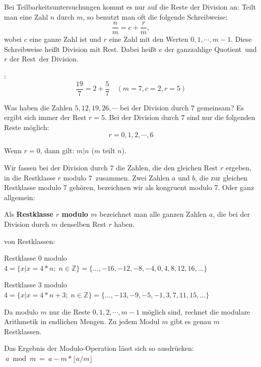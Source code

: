 \begin{refsegment}
Bei Teilbarkeitsuntersuchungen kommt es nur auf die Reste der Division an:
Teilt man eine Zahl $n$ durch $m$, so benutzt man oft die folgende Schreibweise:
$$\frac{n}{m} = c + \frac{r}{m} ,$$
wobei $c$ eine ganze Zahl ist und $r$ eine Zahl mit den Werten $0,1,\cdots,
m-1$.
Diese Schreibweise heißt Division mit Rest. Dabei heißt $c$ der ganzzahlige
\glqq Quotient\grqq~und $r$ der \glqq Rest\grqq~der Division.

\begin{example}{:}
$$\frac{19}{7} = 2 + \frac{5}{7} \quad (m=7, c = 2, r = 5)$$
\end{example}
Was haben die Zahlen $5, 12, 19, 26, \cdots$ bei der Division durch $7$
gemeinsam?
Es ergibt sich immer der Rest $r = 5$.
Bei der Division durch $7$ sind nur die folgenden Reste möglich:
$$r = 0, 1, 2, \cdots, 6$$

Wenn $r = 0$, dann gilt: $m | n$ (\glqq  $m$ teilt $n$\grqq).

Wir fassen bei der Division durch $7$ die Zahlen, die den gleichen Rest $r$
ergeben, in die \glqq Restklasse $r$ modulo $7$\grqq~zusammen. Zwei Zahlen $a$
und $b$, die zur gleichen Restklasse modulo $7$ gehören, bezeichnen wir als
\glqq kongruent modulo 7\grqq. Oder ganz allgemein:

\begin{definition}\label{def-zth-remainder} 
Als {\bf Restklasse $r$ modulo $m$} bezeichnet man alle ganzen Zahlen $a$, die
bei der Division durch $m$ denselben Rest $r$ haben.
\end{definition}
\newpage
\begin{example}{ von Restklassen:}
\begin{compactitem}
\item[] Restklasse $0$ modulo $4 = \{ x | x = 4*n; \; n \in \mathbb{Z} \} = \{ \dots, -16, -12, -8, -4, 0, 4, 8, 12, 16, \dots \}$
\item[] Restklasse $3$ modulo $4 = \{ x | x = 4*n + 3;\; n \in \mathbb{Z} \} = \{ \dots, -13, -9, -5, -1, 3, 7, 11, 15, \dots \}$
\end{compactitem}
\end{example}
Da modulo $m$ nur die Reste $0, 1, 2, \cdots, m-1$ möglich sind, rechnet die modulare Arithmetik in endlichen Mengen.
Zu jedem Modul $m$ gibt es genau $m$ Restklassen.

Das Ergebnis der Modulo-Operation lässt sich so ausdrücken:
$~a \bmod{m} ~ =  ~ a - m * \lfloor a/m \rfloor$\\




\end{refsegment}
